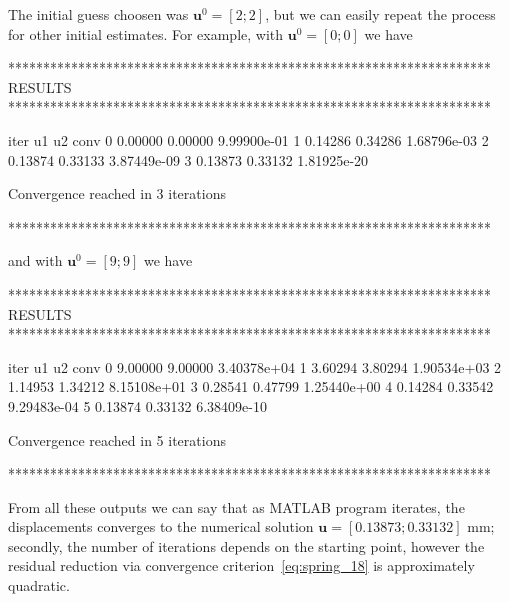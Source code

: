 The initial guess choosen was $\mathbf{u}^0=[2;2]$, but we can easily repeat the process for other initial estimates. For example, with $\mathbf{u}^0=[0;0]$ we have 
\begin{matlaboutput}
*********************************************************************
RESULTS
*********************************************************************

iter   u1        u2        conv
   0   0.00000   0.00000   9.99900e-01
   1   0.14286   0.34286   1.68796e-03
   2   0.13874   0.33133   3.87449e-09
   3   0.13873   0.33132   1.81925e-20

Convergence reached in 3 iterations

*********************************************************************
\end{matlaboutput}

\newpage

and with $\mathbf{u}^0=[9;9]$ we have
\begin{matlaboutput}
*********************************************************************
RESULTS
*********************************************************************

iter   u1        u2        conv
   0   9.00000   9.00000   3.40378e+04
   1   3.60294   3.80294   1.90534e+03
   2   1.14953   1.34212   8.15108e+01
   3   0.28541   0.47799   1.25440e+00
   4   0.14284   0.33542   9.29483e-04
   5   0.13874   0.33132   6.38409e-10

Convergence reached in 5 iterations

*********************************************************************
\end{matlaboutput}

From all these outputs we can say that as MATLAB program iterates, the displacements converges to the numerical solution $\mathbf{u}=[0.13873;0.33132]$ mm; secondly, the number of iterations depends on the starting point, however the residual reduction via convergence criterion~\eqref{eq:spring_18} is approximately quadratic.

